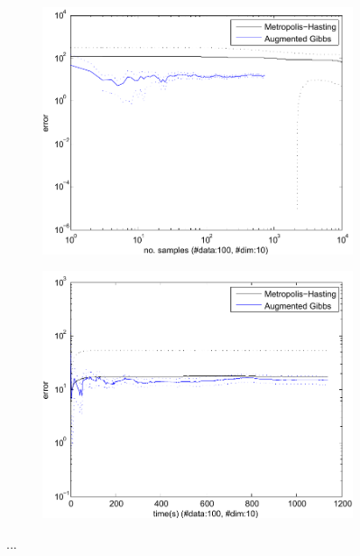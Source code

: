 \begin{figure}
\begin{subfigure}{.40\textwidth}
  \centering
  \includegraphics[width=1.00\textwidth]{pic/errVsamplesMMM100.pdf}
  \caption{}
  \label{fig:error-samples-bppl}
\end{subfigure}%
\begin{subfigure}{.40\textwidth}
  \centering
  \includegraphics[width=1.05\textwidth]{pic/errVtimeMMM100.pdf}
  \caption{}
  \label{fig:error-samples-bppl}
\end{subfigure}%
\caption{
\footnotesize
...%
}
\label{fig:results2}
\end{figure}




